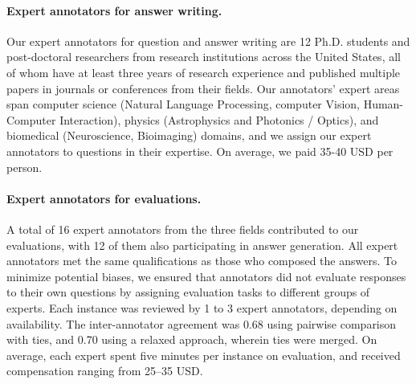 \paragraph{Expert annotators for answer writing.} 
Our expert annotators for question and answer writing are 12 Ph.D. students and post-doctoral researchers from research institutions across the United States, all of whom have at least three years of research experience and published multiple papers in journals or conferences from their fields.  
Our annotators' expert areas span computer science (Natural Language Processing, computer Vision, Human-Computer Interaction), physics (Astrophysics and Photonics / Optics), and biomedical (Neuroscience, Bioimaging) domains, and we assign our expert annotators to  questions in their expertise. On average, we paid 35-40 USD per person. 

\paragraph{Expert annotators for evaluations.} 
A total of 16 expert annotators from the three fields contributed to our evaluations, with 12 of them also participating in answer generation. All expert annotators met the same qualifications as those who composed the answers. To minimize potential biases, we ensured that annotators did not evaluate responses to their own questions by assigning evaluation tasks to different groups of experts. 
Each instance was reviewed by 1 to 3 expert annotators, depending on availability. The inter-annotator agreement was 0.68 using pairwise comparison with ties, and 0.70 using a relaxed approach, wherein ties were merged. On average, each expert spent five minutes per instance on evaluation, and received compensation ranging from 25–35 USD. 

